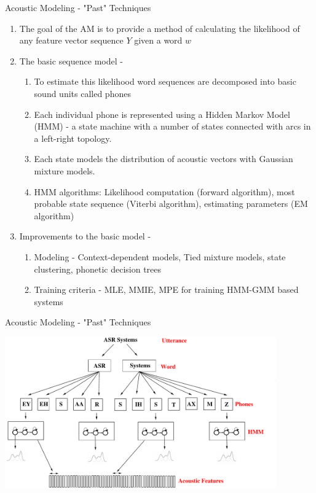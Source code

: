 \begin{frame}{Acoustic Modeling - "Past" Techniques}
\begin{enumerate}
\item The \alert{goal of the AM} is to provide a method of calculating the likelihood
of any feature vector sequence $Y$ given a word $w$
\item \alert{The basic \alert{sequence} model} -
\begin{enumerate}
\item To estimate this likelihood word sequences are decomposed into basic sound units
called phones
\item Each individual phone is represented using a Hidden Markov Model (HMM) - a state machine with 
a number of states connected with arcs in a left-right topology.
\item Each state models the distribution of acoustic vectors with Gaussian mixture models.
\item HMM algorithms: Likelihood computation (forward algorithm), most probable state sequence (Viterbi algorithm), 
estimating parameters (EM algorithm)
\end{enumerate}
\item \alert{Improvements to the basic model} -
\begin{enumerate}
\item Modeling - Context-dependent models, Tied mixture models, state clustering, phonetic decision trees
\item Training criteria - MLE, MMIE, MPE for training HMM-GMM based systems
\end{enumerate}
\end{enumerate}
\end{frame}

\begin{frame}{Acoustic Modeling - "Past" Techniques}
\begin{center}
\includegraphics[height=65mm]{figures/am-gmm}
\end{center}
\end{frame}


